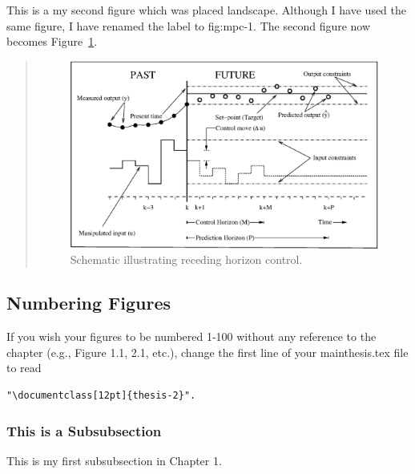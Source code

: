 This is a my second figure which was placed landscape.  Although I have used the same figure, I have renamed the label to fig:mpc-1.  The second figure now becomes Figure~\ref{fig:mpc-1}.
\begin{landscape}
\renewcommand{\baselinestretch}{1}
\small\normalsize
\begin{quote}
\begin{figure}
\begin{center}
\includegraphics[width=8.2in]{mpc.eps}
\end{center}
\caption[Figure placed landscape on page]{Schematic illustrating receding horizon control. \label{fig:mpc-1}}
\end{figure}
\end{quote}
\renewcommand{\baselinestretch}{2}
\small\normalsize
\end{landscape}

\subsection{Numbering Figures}

If you wish your figures to be numbered 1-100 without any reference to the chapter (e.g., Figure 1.1, 2.1, etc.), change the first line of your mainthesis.tex file to read \begin{verbatim}"\documentclass[12pt]{thesis-2}".\end{verbatim}  

\subsubsection{This is a Subsubsection}

This is my first subsubsection in Chapter 1.


